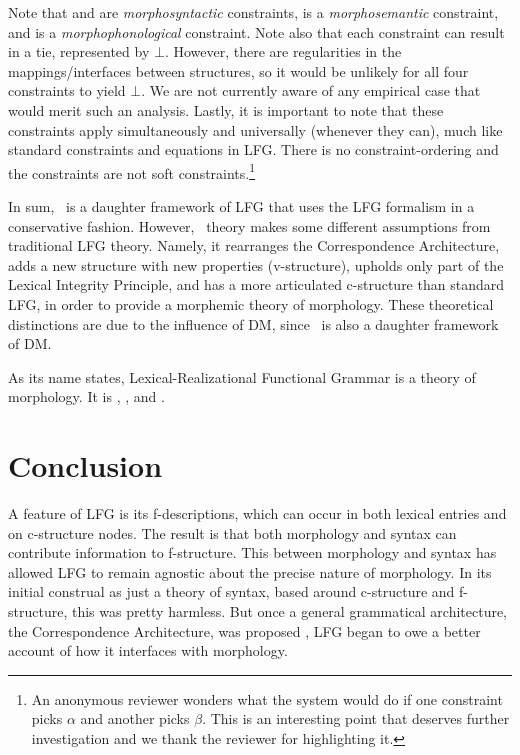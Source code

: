 \documentclass[output=paper,hidelinks]{langscibook}
\begin{document}
Note that \amic[] and \amif[] are \emph{morphosyntactic}
constraints, \amis[] is a \emph{morphosemantic} constraint, and
\amsp[] is a \emph{morphophonological} constraint.  Note also
that each constraint can result in a tie, represented by
$\bot$. However, there are regularities in the mappings/interfaces
between structures, so it would be unlikely for all four 
constraints to yield $\bot$. We are not currently aware of any
empirical case that would merit such an analysis. Lastly, it is
important to note that these constraints apply simultaneously and
universally (whenever they can), much like standard constraints and
equations in LFG. There is no constraint-ordering and the constraints
are not soft constraints.\footnote{An anonymous reviewer wonders what the
  system would do if one constraint picks $\alpha$ and another picks
  $\beta$. This is an interesting point that deserves further
  investigation and we thank the reviewer for highlighting it.}


In sum, \lrfg\ is a daughter framework of LFG that uses the LFG
formalism in a conservative fashion. However, \lrfg\ theory makes some
different assumptions from traditional LFG theory. Namely, it
rearranges the Correspondence Architecture, adds a new structure with
new properties (v-structure), upholds only part of the Lexical
Integrity Principle, and has a more articulated c-structure than
standard LFG, in order to provide a morphemic theory of
morphology. These theoretical distinctions are due to the influence of
DM, since \lrfg\ is also a daughter framework of DM.

\begin{sloppypar}
  As its name states, Lexical-Realizational Functional Grammar is a
   theory of morphology. It is
  , , and
  .
\end{sloppypar}

\section{Conclusion}
A feature of LFG is its f-descriptions, which can occur in both
lexical entries and on c-structure nodes. The result is that both
morphology and syntax can contribute information to f-structure. This
 between morphology and syntax has allowed
LFG to remain agnostic about the precise nature of morphology. In its
initial construal as just a theory of syntax, based around c-structure
and f-structure, this was pretty harmless. But once a general
grammatical architecture, the Correspondence Architecture, was
proposed \citep{kapl:89,kaplan1995formal}, LFG began to owe a better account of how it
interfaces with morphology. 
\end{document}
